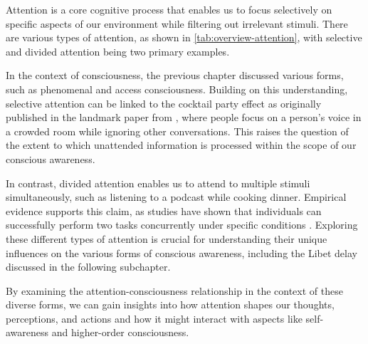 \documentclass[10pt]{article}
\begin{document}
\begin{sloppypar}
  Attention is a core cognitive process that enables us to focus selectively on specific aspects of our environment while filtering out irrelevant stimuli. There are various types of attention, as shown in \autoref{tab:overview-attention}, with selective \citep{koivisto_relationship_2009} and divided attention \citep{mckanna_divided_2009} being two primary examples.

  In the context of consciousness, the previous chapter discussed various forms, such as phenomenal and access consciousness. Building on this understanding, selective attention can be linked to the cocktail party effect as originally published in the landmark paper from \cite{cherry_experiments_1953}, where people focus on a person’s voice in a crowded room while ignoring other conversations. This raises the question of the extent to which unattended information is processed within the scope of our conscious awareness.

  In contrast, divided attention enables us to attend to multiple stimuli simultaneously, such as listening to a podcast while cooking dinner. Empirical evidence supports this claim, as studies have shown that individuals can successfully perform two tasks concurrently under specific conditions \citep{rodrigue_spatio-temporal_2015}. Exploring these different types of attention is crucial for understanding their unique influences on the various forms of conscious awareness, including the Libet delay discussed in the following subchapter.

  By examining the attention-consciousness relationship in the context of these diverse forms, we can gain insights into how attention shapes our thoughts, perceptions, and actions and how it might interact with aspects like self-awareness and higher-order consciousness.


\end{sloppypar}
\end{document}
